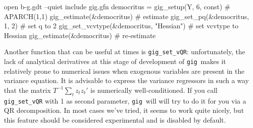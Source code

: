 \documentclass[a4paper,11pt]{article}
\newcommand{\gig}{\texttt{gig}}
\begin{document}
\begin{code}
open b-g.gdt --quiet
include gig.gfn
democritus = gig_setup(Y, 6, const)       # APARCH(1,1)
gig_estimate(&democritus)                 # estimate
gig_set_pq(&democritus, 1, 2)             # set q to 2
gig_set_vcvtype(&democritus, "Hessian")   # set vcvtype to Hessian
gig_estimate(&democritus)                 # re-estimate
\end{code}

Another function that can be useful at times is
\texttt{gig\_set\_vQR}: unfortunately, the lack of analytical
derivatives at this stage of development of \gig\ makes it relatively
prone to numerical issues when exogenous variables are present in the
variance equation. It is advisable to express the variance regressors
in such a way that the matrix $T^{-1} \sum_t z_t z_t'$ is numerically
well-conditioned. If you call \texttt{gig\_set\_vQR} with 1 as second
parameter, \gig\ will will try to do it for you via a QR
decomposition. In most cases we've tried, it seems to work quite
nicely, but this feature should be considered experimental and is
disabled by default.
\end{document}
